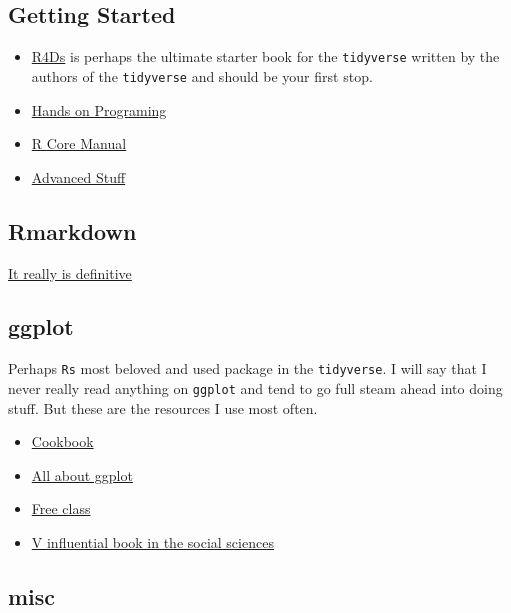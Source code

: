 \documentclass[]{tufte-handout}
\providecommand{\tightlist}{%
  \setlength{\itemsep}{0pt}\setlength{\parskip}{0pt}}
\begin{document}
\hypertarget{getting-started-1}{%
\subsection{Getting Started}\label{getting-started-1}}

\begin{itemize}
\item
  \href{https://r4ds.had.co.nz/index.html}{R4Ds} is perhaps the ultimate
  starter book for the \texttt{tidyverse} written by the authors of the
  \texttt{tidyverse} and should be your first stop.
\item
  \href{https://rstudio-education.github.io/hopr/}{Hands on Programing}
\item
  \href{https://cran.r-project.org/doc/manuals/R-intro.pdf}{R Core
  Manual}
\item
  \href{http://adv-r.had.co.nz/}{Advanced Stuff}
\end{itemize}

\hypertarget{rmarkdown}{%
\subsection{Rmarkdown}\label{rmarkdown}}

\href{https://bookdown.org/yihui/rmarkdown/}{It really is definitive}

\hypertarget{ggplot}{%
\subsection{ggplot}\label{ggplot}}

Perhaps \texttt{R\textquotesingle{}s} most beloved and used package in
the \texttt{tidyverse}. I will say that I never really read anything on
\texttt{ggplot} and tend to go full steam ahead into doing stuff. But
these are the resources I use most often.

\begin{itemize}
\tightlist
\item
  \href{https://r-graphics.org/}{Cookbook}
\item
  \href{https://ggplot2-book.org/index.html}{All about ggplot}
\item
  \href{https://datavizs21.classes.andrewheiss.com/}{Free class}
\item
  \href{https://socviz.co/}{V influential book in the social sciences}
\end{itemize}

\hypertarget{misc}{%
\subsection{misc}\label{misc}}
\end{document}
